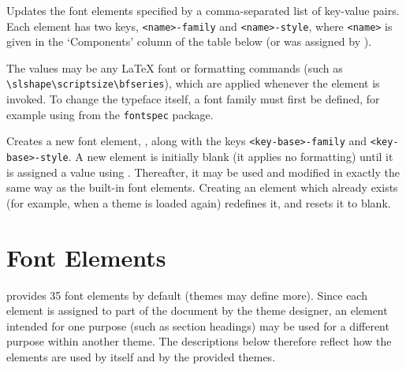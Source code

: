 		{
			Updates the font elements specified by a comma-separated list of key-value pairs. Each element has two keys, \texttt{<name>-family} and \texttt{<name>-style}, where \texttt{<name>} is given in the `Components' column of the table below (or was assigned by ).

			The values may be any \LaTeX{} font or formatting commands (such as \texttt{\textbackslash{}slshape\textbackslash{}scriptsize\textbackslash{}bfseries}), which are applied whenever the element is invoked. To change the typeface itself, a font family must first be defined, for example using  from the \texttt{fontspec} package.

		}
		{
			Creates a new font element, , along with the keys \texttt{<key-base>-family} and \texttt{<key-base>-style}. A new element is initially blank (it applies no formatting) until it is assigned a value using . Thereafter, it may be used and modified in exactly the same way as the built-in font elements. Creating an element which already exists (for example, when a theme is loaded again) redefines it, and resets it to blank.

		}

	\section{Font Elements}

		\rpgtex{} provides 35 font elements by default (themes may define more). Since each element is assigned to part of the document by the theme designer, an element intended for one purpose (such as section headings) may be used for a different purpose within another theme. The descriptions below therefore reflect how the elements are used by \rpgtex{} itself and by the provided themes.

